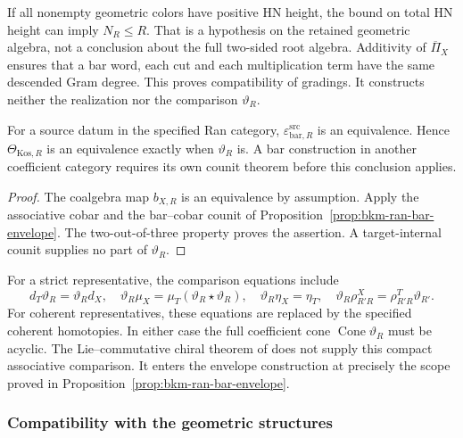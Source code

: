 If all nonempty geometric colors have positive HN height, the
bound on total HN height can imply $N_R\leq R$. That is a hypothesis
on the retained geometric algebra, not a conclusion about the full
two-sided root algebra. Additivity of $\overline\Pi_X$ ensures that
a bar word, each cut and each multiplication term have the same
descended Gram degree. This proves compatibility of gradings. It
constructs neither the realization nor the comparison $\vartheta_R$.

\begin{corollary}
\label{cor:source-bar-remaining-cobar-obstruction}
For a source datum in the specified Ran category,
$\varepsilon^{\mathrm{src}}_{\mathrm{bar},R}$ is an equivalence.
Hence $\Theta_{\mathrm{Kos},R}$ is an equivalence exactly when
$\vartheta_R$ is. A bar construction in another coefficient category
requires its own counit theorem before this conclusion applies.
\end{corollary}
\begin{proof}
The coalgebra map $b_{X,R}$ is an equivalence by assumption.
Apply the associative cobar and the bar--cobar counit of
Proposition~\ref{prop:bkm-ran-bar-envelope}. The two-out-of-three
property proves the assertion. A target-internal counit supplies
no part of $\vartheta_R$.
\end{proof}

For a strict representative, the comparison equations include
\[
 d_T\vartheta_R=\vartheta_Rd_X,\quad
 \vartheta_R\mu_X=\mu_T(\vartheta_R\star\vartheta_R),\quad
 \vartheta_R\eta_X=\eta_T,\quad
 \vartheta_R\rho^X_{R'R}=\rho^T_{R'R}\vartheta_{R'}.
\]
For coherent representatives, these equations are replaced by the
specified coherent homotopies. In either case the full coefficient
cone $\operatorname{Cone}\vartheta_R$ must be acyclic.
The Lie--commutative chiral theorem of
\cite[Theorems~5.1.1--5.2.1]{FrancisGaitsgoryCKD} does not supply
this compact associative comparison. It enters the envelope
construction at precisely the scope proved in
Proposition~\ref{prop:bkm-ran-bar-envelope}.

\subsubsection*{Compatibility with the geometric structures}

